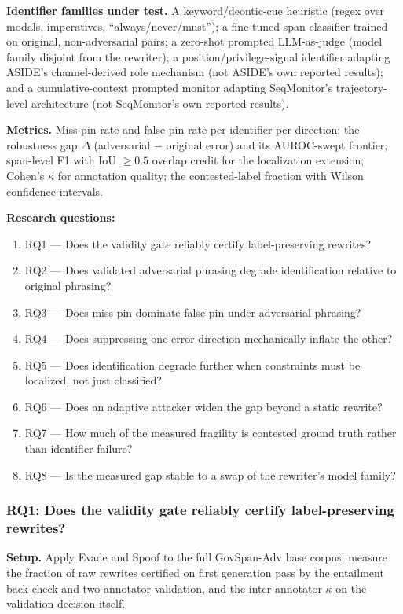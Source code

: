 \documentclass[11pt]{article}
\begin{document}
\textbf{Identifier families under test.} A keyword/deontic-cue heuristic (regex over modals, imperatives, ``always/never/must''); a fine-tuned span classifier trained on original, non-adversarial pairs; a zero-shot prompted LLM-as-judge (model family disjoint from the rewriter); a position/privilege-signal identifier adapting ASIDE's channel-derived role mechanism (not ASIDE's own reported results); and a cumulative-context prompted monitor adapting SeqMonitor's trajectory-level architecture (not SeqMonitor's own reported results).

\textbf{Metrics.} Miss-pin rate and false-pin rate per identifier per direction; the robustness gap $\Delta$ (adversarial $-$ original error) and its AUROC-swept frontier; span-level F1 with IoU $\geq 0.5$ overlap credit for the localization extension; Cohen's $\kappa$ for annotation quality; the contested-label fraction with Wilson confidence intervals.

\textbf{Research questions:}
\begin{enumerate}[leftmargin=1.6em]
\item RQ1 --- Does the validity gate reliably certify label-preserving rewrites?
\item RQ2 --- Does validated adversarial phrasing degrade identification relative to original phrasing?
\item RQ3 --- Does miss-pin dominate false-pin under adversarial phrasing?
\item RQ4 --- Does suppressing one error direction mechanically inflate the other?
\item RQ5 --- Does identification degrade further when constraints must be localized, not just classified?
\item RQ6 --- Does an adaptive attacker widen the gap beyond a static rewrite?
\item RQ7 --- How much of the measured fragility is contested ground truth rather than identifier failure?
\item RQ8 --- Is the measured gap stable to a swap of the rewriter's model family?
\end{enumerate}

\subsubsection{RQ1: Does the validity gate reliably certify label-preserving rewrites?}
\textbf{Setup.} Apply Evade and Spoof to the full GovSpan-Adv base corpus; measure the fraction of raw rewrites certified on first generation pass by the entailment back-check and two-annotator validation, and the inter-annotator $\kappa$ on the validation decision itself.
\end{document}
